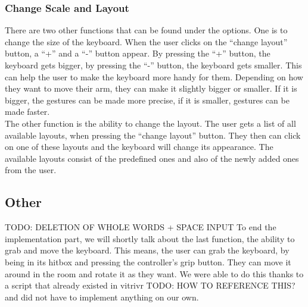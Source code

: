 \subsubsection{Change Scale and Layout}
There are two other functions that can be found under the options. One is to change the size of the keyboard. When the user clicks on the ``change layout'' button, a ``+'' and a ``-'' button appear. By pressing the ``+'' button, the keyboard gets bigger, by pressing the ``-'' button, the keyboard gets smaller. This can help the user to make the keyboard more handy for them. Depending on how they want to move their arm, they can make it slightly bigger or smaller. If it is bigger, the gestures can be made more precise, if it is smaller, gestures can be made faster.\\
The other function is the ability to change the layout. The user gets a list of all available layouts, when pressing the ``change layout'' button. They then can click on one of these layouts and the keyboard will change its appearance. The available layouts consist of the predefined ones and also of the newly added ones from the user.

\subsection{Other}
TODO: DELETION OF WHOLE WORDS + SPACE INPUT
To end the implementation part, we will shortly talk about the last function, the ability to grab and move the keyboard. This means, the user can grab the keyboard, by being in its hitbox and pressing the controller's grip button. They can move it around in the room and rotate it as they want. We were able to do this thanks to a script that already existed in vitrivr TODO: HOW TO REFERENCE THIS? and did not have to implement anything on our own.